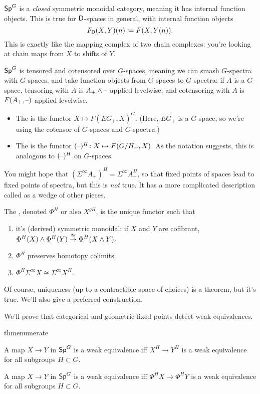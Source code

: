$\mathsf{Sp}^G$ is a \emph{closed} symmetric monoidal category, meaning it has internal function objects. This is true for
$\mathsf D$-spaces in general, with internal function objects
\[F_\mathsf D(X,Y)(n) \coloneqq F(X, Y(n)).\]
This is exactly like the mapping complex of two chain complexes: you're looking at chain maps from $X$ to shifts of
$Y$.

$\mathsf{Sp}^G$ is tensored and cotensored over $G$-spaces, meaning we can smash $G$-spectra with $G$-spaces, and take
function objects from $G$-spaces to $G$-spectra: if $A$ is a $G$-space, tensoring with $A$ is $A_+\wedge\text{--}$
applied levelwise, and cotensoring with $A$ is $F(A_+,\text{--})$ applied levelwise.
\begin{defn}\hfill
\label{spectra_fixed_points}
\begin{itemize}
	\item The  is the functor $X\mapsto F(EG_+, X)^G$. (Here, $EG_+$ is a $G$-space, so
	we're using the cotensor of $G$-spaces and $G$-spectra.)
	\item The  is the functor $(\bl)^H\colon X\mapsto F(G/H_+, X)$. As the notation
	suggests, this is analogous to $(\text{--})^H$ on $G$-spaces.
\end{itemize}
\end{defn}
\begin{warn}
You might hope that $(\Sigma^\infty A_+)^H = \Sigma^\infty A_+^H$, so that fixed points of spaces lead to fixed
points of spectra, but this is \emph{not} true. It has a more complicated description called  as a wedge of other pieces.
\end{warn}
\begin{defn}
The , denoted $\Phi^H$ or also $X^{gH}$, is the unique functor
such that
\begin{enumerate}
	\item it's (derived) symmetric monoidal: if $X$ and $Y$ are cofibrant,
	$\Phi^H(X)\wedge\Phi^H(Y)\stackrel\cong\to\Phi^H(X\wedge Y)$.
	\item $\Phi^H$ preserves homotopy colimits.
	\item $\Phi^H\Sigma^\infty X \cong \Sigma^\infty X^H$.
\end{enumerate}
\end{defn}
Of course, uniqueness (up to a contractible space of choices) is a theorem, but it's true. We'll also give a
preferred construction.

We'll prove that categorical and geometric fixed points detect weak equivalences.
\begin{comp}{thm}{enumerate}
	\item A map $X\to Y$ in $\mathsf{Sp}^G$ is a weak equivalence iff $X^H\to Y^H$ is a weak equivalence for all subgroups
	$H\subset G$.
	\item A map $X\to Y$ in $\mathsf{Sp}^G$ is a weak equivalence iff $\Phi^H X\to \Phi^H Y$ is a weak equivalence for all
	subgroups $H\subset G$.
\end{comp}

